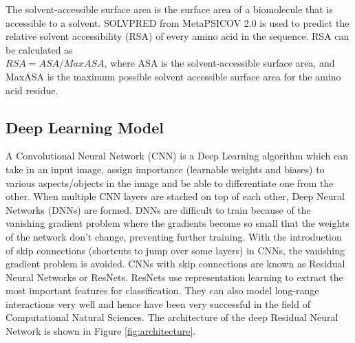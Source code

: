 \documentclass[journal=jacsat,manuscript=article]{achemso}
\begin{document}
The solvent-accessible surface area is the surface area of a biomolecule that is accessible to a solvent. SOLVPRED from MetaPSICOV 2.0\cite{jones2015metapsicov} is used to predict the relative solvent accessibility (RSA) of every amino acid in the sequence. RSA can be calculated as \\ ${RSA} = {ASA} / {MaxASA}$, where ASA is the solvent-accessible surface area, and MaxASA is the maximum possible solvent accessible surface area for the amino acid residue.





\subsection{Deep Learning Model}
\quad A Convolutional Neural Network (CNN) is a Deep Learning algorithm which can take in an input image, assign importance (learnable weights and biases) to various aspects/objects in the image and be able to differentiate one from the other. When multiple CNN layers are stacked on top of each other, Deep Neural Networks (DNNs) are formed. DNNs are difficult to train because of the vanishing gradient problem where the gradients become so small that the weights of the network don't change, preventing further training. With the introduction of skip connections (shortcuts to jump over some layers) in CNNs, the vanishing gradient problem is avoided. CNNs with skip connections are known as Residual Neural Networks or ResNets. ResNets use representation learning to extract the most important features for classification. They can also model long-range interactions very well and hence have been very successful in the field of Computational Natural Sciences.  The architecture of the deep Residual Neural Network is shown in Figure \ref{fig:architecture}.
\end{document}
